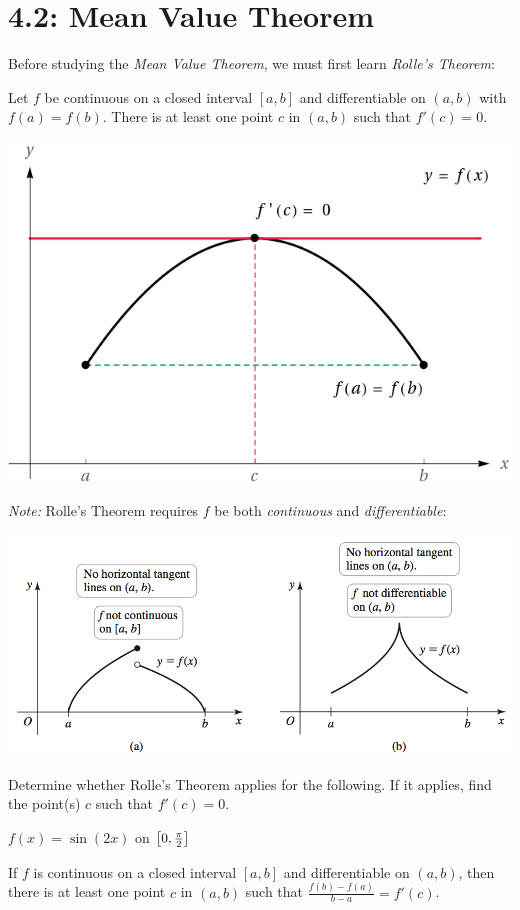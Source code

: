 \documentclass[../mathNotesPreamble]{subfiles}
\begin{document}
\section{4.2: Mean Value Theorem}
Before studying the \textit{Mean Value Theorem}, we must first learn \textit{Rolle's Theorem}:\\

\begin{thmBox*}
  Let $f$ be continuous on a closed interval $[a,b]$ and differentiable on $(a,b)$ with $f(a)=f(b)$. There is at least one point $c$ in $(a,b)$ such that $f'(c)=0$.
\end{thmBox*}

\begin{center}
  \includegraphics[width=0.3\linewidth]{../images/briggs_04_02/RollesThm01.png}
\end{center}

\textit{Note:} Rolle's Theorem requires $f$ be both \textit{continuous} and \textit{differentiable}:
\begin{center}
  \includegraphics[width=0.6\linewidth]{../images/briggs_04_02/RollesThm02.png}
\end{center}

\begin{ex*}
  Determine whether Rolle's Theorem applies for the following. If it applies, find the point(s) $c$ such that $f'(c)=0$.
\end{ex*}
$f(x)=\sin(2x)$ on ${\left[0, \frac{\pi}{2}\right]}$
\pagebreak

\begin{thmBox*}
  If $f$ is continuous on a closed interval $[a,b]$ and differentiable on $(a,b)$, then there is at least one point $c$ in $(a,b)$ such that 
$\frac{f(b)-f(a)}{b-a}=f'(c)$.
\end{thmBox*}
\end{document}
